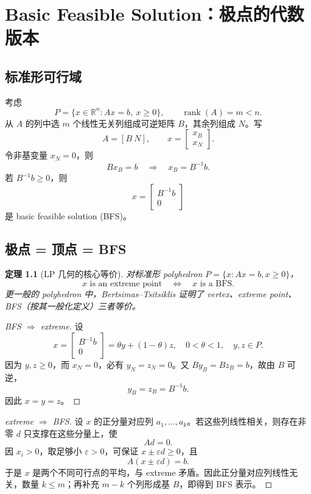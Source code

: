 \documentclass[11pt,a4paper,openany]{ctexrep}
\newtheorem{theorem}{定理}[chapter]
\theoremstyle{definition}
\newcommand{\R}{\mathbb{R}}
\newcommand{\rank}{\operatorname{rank}}
\newcommand{\eps}{\varepsilon}
\begin{document}
\chapter{Basic Feasible Solution：极点的代数版本}

\section{标准形可行域}
考虑
\[
P=\{x\in\R^n:Ax=b,\ x\ge0\},
\qquad \rank(A)=m<n.
\]
从 $A$ 的列中选 $m$ 个线性无关列组成可逆矩阵 $B$，其余列组成 $N$。写
\[
A=[B\ N],\qquad x=\begin{bmatrix}x_B\\x_N\end{bmatrix}.
\]
令非基变量 $x_N=0$，则
\[
Bx_B=b\quad\Longrightarrow\quad x_B=B^{-1}b.
\]
若 $B^{-1}b\ge0$，则
\[
x=\begin{bmatrix}B^{-1}b\\0\end{bmatrix}
\]
是 basic feasible solution (BFS)。\cite[Ch.~2]{luenberger}

\section{极点 = 顶点 = BFS}

\begin{theorem}[LP 几何的核心等价]
对标准形 polyhedron $P=\{x:Ax=b,x\ge0\}$，
\[
\boxed{x\text{ is an extreme point}}
\quad\Longleftrightarrow\quad
\boxed{x\text{ is a BFS}}.
\]
更一般的 polyhedron 中，Bertsimas--Tsitsiklis 证明了 vertex、extreme point、BFS（按其一般化定义）三者等价。\cite[Ch.~2, Thm.~2.3]{bertsimas}
\end{theorem}

\begin{proof}[BFS $\Rightarrow$ extreme]
设
\[
x=\begin{bmatrix}B^{-1}b\\0\end{bmatrix}
=\theta y+(1-\theta)z,
\quad 0<\theta<1,
\quad y,z\in P.
\]
因为 $y,z\ge0$，而 $x_N=0$，必有 $y_N=z_N=0$。又 $By_B=Bz_B=b$，故由 $B$ 可逆，
\[
y_B=z_B=B^{-1}b.
\]
因此 $x=y=z$。
\end{proof}

\begin{proof}[extreme $\Rightarrow$ BFS]
设 $x$ 的正分量对应列 $a_1,\dots,a_k$。若这些列线性相关，则存在非零 $d$ 只支撑在这些分量上，使
\[
Ad=0.
\]
因 $x_i>0$，取足够小 $\eps>0$，可保证 $x\pm\eps d\ge0$，且
\[
A(x\pm\eps d)=b.
\]
于是 $x$ 是两个不同可行点的平均，与 extreme 矛盾。因此正分量对应列线性无关，数量 $k\le m$；再补充 $m-k$ 个列形成基 $B$，即得到 BFS 表示。
\end{proof}
\end{document}
